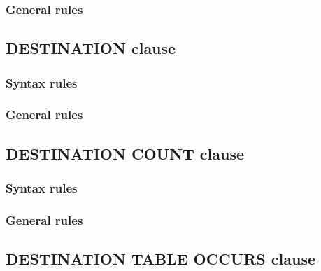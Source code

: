 \subsubsection{General rules}

\subsection{DESTINATION clause}

\begin{syntax}[\deletedcolour]
\end{syntax}

\subsubsection{Syntax rules}

\subsubsection{General rules}

\subsection{DESTINATION COUNT clause}

\begin{syntax}[\deletedcolour]
\end{syntax}

\subsubsection{Syntax rules}

\subsubsection{General rules}

\subsection{DESTINATION TABLE OCCURS clause}

\begin{syntax}[\deletedcolour]
\end{syntax}

